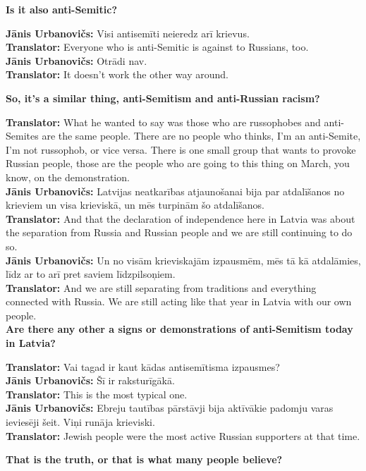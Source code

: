 \textbf{Is it also anti-Semitic?}  

\textbf{Jānis Urbanovičs:} Visi antisemīti neieredz arī krievus.\\ 
\textbf{Translator:} Everyone who is anti-Semitic is against to Russians, too.\\
\textbf{Jānis Urbanovičs:} Otrādi nav.\\ 
\textbf{Translator:} It doesn't work the other way around.  

\textbf{So, it’s a similar thing, anti-Semitism and anti-Russian racism?}  

\textbf{Translator:} What he wanted to say was those who are russophobes and anti-Semites are the same people. There are no people who thinks, I’m an anti-Semite, I’m not russophob, or vice versa. There is one small group that wants to provoke Russian people, those are the people who are going to this thing on March, you know, on the demonstration.\\ 
\textbf{Jānis Urbanovičs:} Latvijas neatkarības atjaunošanai bija par atdalīšanos no krieviem un visa krieviskā, un mēs turpinām šo atdalīšanos.\\
\textbf{Translator:} And that the declaration of independence here in Latvia was about the separation from Russia and Russian people and we are still continuing to do so.\\
\textbf{Jānis Urbanovičs:} Un no visām krieviskajām izpausmēm, mēs tā kā atdalāmies, līdz ar to arī pret saviem līdzpilsoņiem.\\  
\textbf{Translator:} And we are still separating from traditions and everything connected with Russia. We are still acting like that year in Latvia with our own people.\\

\textbf{Are there any other a signs or demonstrations of anti-Semitism today in Latvia?}  

\textbf{Translator:} Vai tagad ir kaut kādas antisemītisma izpausmes?\\ 
\textbf{Jānis Urbanovičs:} Šī ir raksturīgākā.\\  
\textbf{Translator:} This is the most typical one.\\ 
\textbf{Jānis Urbanovičs:} Ebreju tautības pārstāvji bija aktīvākie padomju varas ieviesēji šeit. Viņi runāja krieviski.\\  
\textbf{Translator:} Jewish people were the most active Russian supporters at that time. 

\textbf{That is the truth, or that is what many people believe?}  


